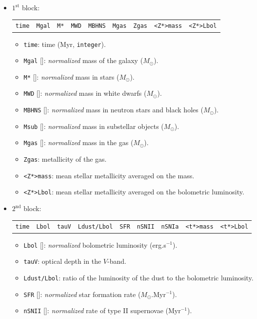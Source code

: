\documentclass[11pt,draft,fleqn]{article}
\begin{document}
\begin{itemize}
\item $1^{\mathrm{st}}$ block: 
\begin{tabular}{@{}ccccccccc}
\texttt{time} & \texttt{Mgal} & \texttt{M*} & \texttt{MWD} &
\texttt{MBHNS} & \texttt{Mgas} & \texttt{Zgas} & \texttt{<Z*>mass} & \texttt{<Z*>Lbol}
\end{tabular}
\begin{itemize}
\item \texttt{time}: time (Myr, \texttt{integer}).
\item \texttt{Mgal} [\dag]: \emph{normalized} mass of the galaxy ($M_{\odot}$).
\item \texttt{M*} [\dag]: \emph{normalized} mass in stars ($M_{\odot}$).
\item \texttt{MWD} [\dag]: \emph{normalized} mass in white dwarfs ($M_{\odot}$).
\item \texttt{MBHNS} [\dag]: \emph{normalized} mass in neutron stars and
black holes ($M_{\odot}$).
\item \texttt{Msub} [\dag]: \emph{normalized} mass in substellar objects ($M_{\odot}$).
\item \texttt{Mgas} [\dag]: \emph{normalized} mass in the gas ($M_{\odot}$).
\item \texttt{Zgas}: metallicity of the gas.
\item \texttt{<Z*>mass}: mean stellar metallicity averaged on the mass.
\item \texttt{<Z*>Lbol}: mean stellar metallicity averaged on the bolometric luminosity.
\end{itemize}
\item $2^{\mathrm{nd}}$ block:
\begin{tabular}{@{}ccccccccc}
\texttt{time} &   \texttt{Lbol} &     \texttt{tauV} &  \texttt{Ldust/Lbol} &  \texttt{SFR} &     \texttt{nSNII} &    \texttt{nSNIa} &  \texttt{<t*>mass} & \texttt{<t*>Lbol} 
\end{tabular}
\begin{itemize}
\item \texttt{Lbol} [\dag]: \emph{normalized} bolometric luminosity (erg.s$^{-1}$).
\item \texttt{tauV}: optical depth in the $V$-band.
\item \texttt{Ldust/Lbol}: ratio of the luminosity of the dust 
to the bolometric luminosity.
\item \texttt{SFR} [\dag]: \emph{normalized} star formation rate ($M_{\odot}$.Myr$^{-1}$).
\item \texttt{nSNII} [\dag]: \emph{normalized} rate of type II supernovae (Myr$^{-1}$).

\end{itemize}
\end{itemize}
\end{document}
